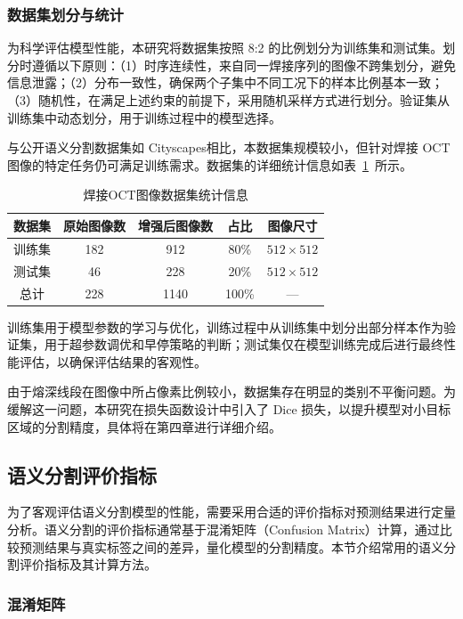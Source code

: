 \subsubsection{数据集划分与统计}

为科学评估模型性能，本研究将数据集按照 8:2 的比例划分为训练集和测试集。划分时遵循以下原则：（1）时序连续性，来自同一焊接序列的图像不跨集划分，避免信息泄露；（2）分布一致性，确保两个子集中不同工况下的样本比例基本一致；（3）随机性，在满足上述约束的前提下，采用随机采样方式进行划分。验证集从训练集中动态划分，用于训练过程中的模型选择。

与公开语义分割数据集如 Cityscapes相比，本数据集规模较小，但针对焊接 OCT 图像的特定任务仍可满足训练需求。数据集的详细统计信息如表~\ref{tab:dataset_statistics}~所示。

\begin{table}[htbp]
\centering
\caption{焊接OCT图像数据集统计信息}
\label{tab:dataset_statistics}
\begin{tabular}{ccccc}
\toprule
\textbf{数据集} & \textbf{原始图像数} & \textbf{增强后图像数} & \textbf{占比} & \textbf{图像尺寸} \\
\midrule
训练集 & 182 & 912 & 80\% & $512 \times 512$ \\
测试集 & 46 & 228 & 20\% & $512 \times 512$ \\
\midrule
总计 & 228 & 1140 & 100\% & — \\
\bottomrule
\end{tabular}
\end{table}

训练集用于模型参数的学习与优化，训练过程中从训练集中划分出部分样本作为验证集，用于超参数调优和早停策略的判断；测试集仅在模型训练完成后进行最终性能评估，以确保评估结果的客观性。

由于熔深线段在图像中所占像素比例较小，数据集存在明显的类别不平衡问题。为缓解这一问题，本研究在损失函数设计中引入了 Dice 损失，以提升模型对小目标区域的分割精度，具体将在第四章进行详细介绍。

\subsection{语义分割评价指标}

为了客观评估语义分割模型的性能，需要采用合适的评价指标对预测结果进行定量分析。语义分割的评价指标通常基于混淆矩阵（Confusion Matrix）计算，通过比较预测结果与真实标签之间的差异，量化模型的分割精度。本节介绍常用的语义分割评价指标及其计算方法。

\subsubsection{混淆矩阵}

